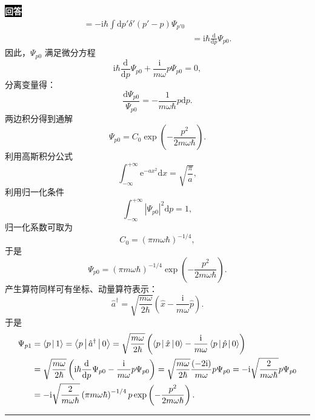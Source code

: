 \documentclass[11pt,a4paper]{ctexart}
\newenvironment{answer}
  {\par\smallskip\noindent
   \begingroup
   \setlength{\fboxsep}{4pt}%
   \colorbox{black}{\textcolor{white}{\bfseries 回答}}%
   \endgroup
   \quad\ignorespaces}
  {\par\smallskip\noindent\rule{\linewidth}{0.4pt}\medskip}
\begin{document}
\begin{answer}
\begin{equation}
\begin{aligned}
      =-\mathrm{i} \hbar \int \mathrm{d}p' \delta'(p'-p) \Psi_{p'0} \\
      &=\mathrm{i}\hbar \frac{\mathrm{d} }{\mathrm{d}p } \Psi_{p0}.
    \end{aligned}
  \end{equation}
  因此，$\Psi_{p0} $ 满足微分方程
  \begin{equation}
    \mathrm{i}\hbar \frac{\mathrm{d} }{\mathrm{d}p } \Psi_{p0} + \frac{\mathrm{i} }{m\omega } p \Psi_{p0} = 0, 
  \end{equation}
  分离变量得：
  \begin{equation}
    \frac{\mathrm{d}\Psi_{p0} }{\Psi_{p0} } = -\frac{1 }{m\omega \hbar } p \mathrm{d}p.
  \end{equation}
  两边积分得到通解
  \begin{equation}
    \Psi_{p0} = C_0 \exp\left(-\frac{p^2 }{2m\omega\hbar }  \right).
  \end{equation}
  利用高斯积分公式
  \begin{equation}
    \int_{-\infty}^{+\infty} \mathrm{e}^{-ax^2}\mathrm{d}x
    =\sqrt{\frac{\pi }{a } },
  \end{equation}
  利用归一化条件
  \begin{equation}
    \int_{-\infty}^{+\infty} \left|\Psi_{p0} \right|^2\mathrm{d}p=1,
  \end{equation}
  归一化系数可取为
  \begin{equation}
    C_0 = \left(\pi m\omega\hbar \right)^{-1/4},
  \end{equation}
  于是
  \begin{equation}
    \Psi_{p0} = \left(\pi m\omega\hbar \right)^{-1/4} \exp\left(-\frac{p^2 }{2m\omega\hbar } \right).
  \end{equation}
  产生算符同样可有坐标、动量算符表示：
  \begin{equation}
    \hat{a}^\dag
    =\sqrt{\frac{m\omega }{2\hbar } }\left(\hat{x}-\frac{\mathrm{i} }{m\omega } \hat{p} \right).
  \end{equation}
  于是
  \begin{equation}
    \begin{aligned}
      \Psi_{p1}
      &=\Braket{p|1 }
      =\Braket{p|\hat{a}^\dag|0 }
      =\sqrt{\frac{m\omega }{2\hbar } }\left(\Braket{p|\hat{x}|0 } - \frac{\mathrm{i} }{m\omega }\Braket{p|\hat{p}|0 }  \right) \\
      &=\sqrt{\frac{m\omega }{2\hbar } } \left(\mathrm{i}\hbar\frac{\mathrm{d} }{\mathrm{d}p } \Psi_{p0} - \frac{\mathrm{i} }{m\omega } p\Psi_{p0}  \right)
      =\sqrt{\frac{m\omega }{2\hbar } } \frac{\left(-2\mathrm{i} \right) }{m\omega } p \Psi_{p0}
      =-\mathrm{i}\sqrt{\frac{2 }{m\omega\hbar } } p \Psi_{p0} \\
      &=-\mathrm{i}\sqrt{\frac{2 }{m\omega\hbar } } \left(\pi m\omega\hbar \right)^{-1/4} p \exp\left(-\frac{p^2 }{2m\omega\hbar } \right).
    \end{aligned}
  \end{equation}
\end{answer}
\end{document}
